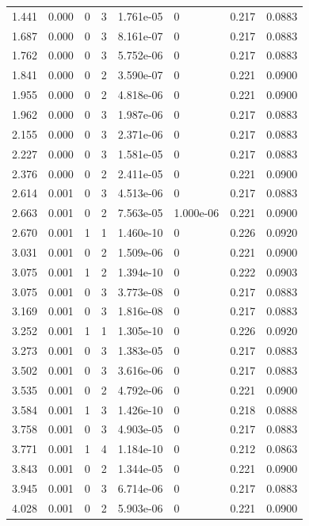 \documentclass[preview]{standalone}
\begin{document}
{{\begin{tabular}{L{1.2cm}C{1.2cm} C{0.3cm}C{0.5cm} C{1.4cm}C{1.4cm} C{1.4cm}C{1.4cm}}
  1.441  &  0.000  & 0     &  3 &  1.761e-05  & 0  & 0.217 &  0.0883   \\ 
  1.687  &  0.000  & 0     &  3 &  8.161e-07  & 0  & 0.217 &  0.0883   \\ 
  1.762  &  0.000  & 0     &  3 &  5.752e-06  & 0  & 0.217 &  0.0883   \\ 
  1.841  &  0.000  & 0     &  2 &  3.590e-07  & 0  & 0.221 &  0.0900   \\ 
  1.955  &  0.000  & 0     &  2 &  4.818e-06  & 0  & 0.221 &  0.0900   \\ 
  1.962  &  0.000  & 0     &  3 &  1.987e-06  & 0  & 0.217 &  0.0883   \\ 
  2.155  &  0.000  & 0     &  3 &  2.371e-06  & 0  & 0.217 &  0.0883   \\ 
  2.227  &  0.000  & 0     &  3 &  1.581e-05  & 0  & 0.217 &  0.0883   \\ 
  2.376  &  0.000  & 0     &  2 &  2.411e-05  & 0  & 0.221 &  0.0900   \\ 
  2.614  &  0.001  & 0     &  3 &  4.513e-06  & 0  & 0.217 &  0.0883   \\ 
  2.663  &  0.001  & 0     &  2 &  7.563e-05  & 1.000e-06  & 0.221 &  0.0900   \\ 
  2.670  &  0.001  & 1     &  1 &  1.460e-10  & 0  & 0.226 &  0.0920   \\ 
  3.031  &  0.001  & 0     &  2 &  1.509e-06  & 0  & 0.221 &  0.0900   \\ 
  3.075  &  0.001  & 1     &  2 &  1.394e-10  & 0  & 0.222 &  0.0903   \\ 
  3.075  &  0.001  & 0     &  3 &  3.773e-08  & 0  & 0.217 &  0.0883   \\ 
  3.169  &  0.001  & 0     &  3 &  1.816e-08  & 0  & 0.217 &  0.0883   \\ 
  3.252  &  0.001  & 1     &  1 &  1.305e-10  & 0  & 0.226 &  0.0920   \\ 
  3.273  &  0.001  & 0     &  3 &  1.383e-05  & 0  & 0.217 &  0.0883   \\ 
  3.502  &  0.001  & 0     &  3 &  3.616e-06  & 0  & 0.217 &  0.0883   \\ 
  3.535  &  0.001  & 0     &  2 &  4.792e-06  & 0  & 0.221 &  0.0900   \\ 
  3.584  &  0.001  & 1     &  3 &  1.426e-10  & 0  & 0.218 &  0.0888   \\ 
  3.758  &  0.001  & 0     &  3 &  4.903e-05  & 0  & 0.217 &  0.0883   \\ 
  3.771  &  0.001  & 1     &  4 &  1.184e-10  & 0  & 0.212 &  0.0863   \\ 
  3.843  &  0.001  & 0     &  2 &  1.344e-05  & 0  & 0.221 &  0.0900   \\ 
  3.945  &  0.001  & 0     &  3 &  6.714e-06  & 0  & 0.217 &  0.0883   \\ 
  4.028  &  0.001  & 0     &  2 &  5.903e-06  & 0  & 0.221 &  0.0900   \\ 
\hline 
\end{tabular} 

}}
\end{document}

